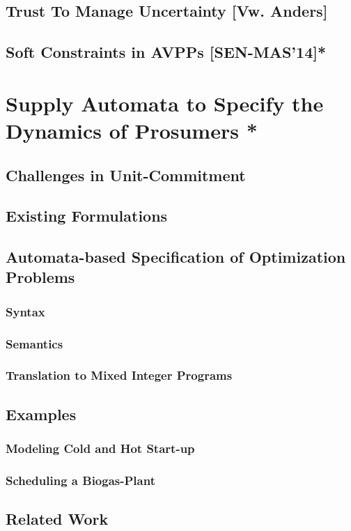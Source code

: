 \documentclass[10pt,a4paper]{book}
\begin{document}
\section{Trust To Manage Uncertainty [Vw. Anders]}
\section{Soft Constraints in AVPPs [SEN-MAS'14]*}

\chapter{Supply Automata to Specify the Dynamics of Prosumers \allowbreak  [TCCI'15]*}
\section{Challenges in Unit-Commitment}
\section{Existing Formulations}
\section{Automata-based Specification of Optimization Problems}
\subsection{Syntax}
\subsection{Semantics}
\subsection{Translation to Mixed Integer Programs}
\section{Examples}
\subsection{Modeling Cold and Hot Start-up}
\subsection{Scheduling a Biogas-Plant}
\section{Related Work}
\end{document}

